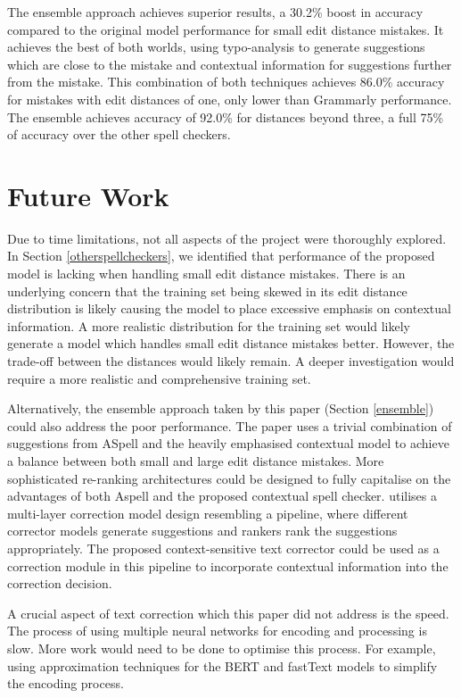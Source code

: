 \documentclass[11pt,a4paper]{article}
\begin{document}
The ensemble approach achieves superior results, a 30.2\% boost in accuracy compared to the original model performance for small edit distance mistakes. It achieves the best of both worlds, using typo-analysis to generate suggestions which are close to the mistake and contextual information for suggestions further from the mistake. This combination of both techniques achieves 86.0\% accuracy for mistakes with edit distances of one, only lower than Grammarly performance. The ensemble achieves accuracy of 92.0\% for distances beyond three, a full 75\% of accuracy over the other spell checkers. 

\section{Future Work}
Due to time limitations, not all aspects of the project were thoroughly explored. In Section \ref{otherspellcheckers}, we identified that performance of the proposed model is lacking when handling small edit distance mistakes. There is an underlying concern that the training set being skewed in its edit distance distribution is likely causing the model to place excessive emphasis on contextual information. A more realistic distribution for the training set would likely generate a model which handles small edit distance mistakes better. However, the trade-off between the distances would likely remain. A deeper investigation would require a more realistic and comprehensive training set. 

Alternatively, the ensemble approach taken by this paper (Section \ref{ensemble}) could also address the poor performance. The paper uses a trivial combination of suggestions from ASpell and the heavily emphasised contextual model to achieve a balance between both small and large edit distance mistakes. More sophisticated re-ranking architectures could be designed to fully capitalise on the advantages of both Aspell and the proposed contextual spell checker. \citet{CSpell} utilises a multi-layer correction model design resembling a pipeline, where different corrector models generate suggestions and rankers rank the suggestions appropriately. The proposed context-sensitive text corrector could be used as a correction module in this pipeline to incorporate contextual information into the correction decision.   

A crucial aspect of text correction which this paper did not address is the speed. The process of using multiple neural networks for encoding and processing is slow. More work would need to be done to optimise this process. For example, using approximation techniques for the BERT and fastText models to simplify the encoding process.
\end{document}
